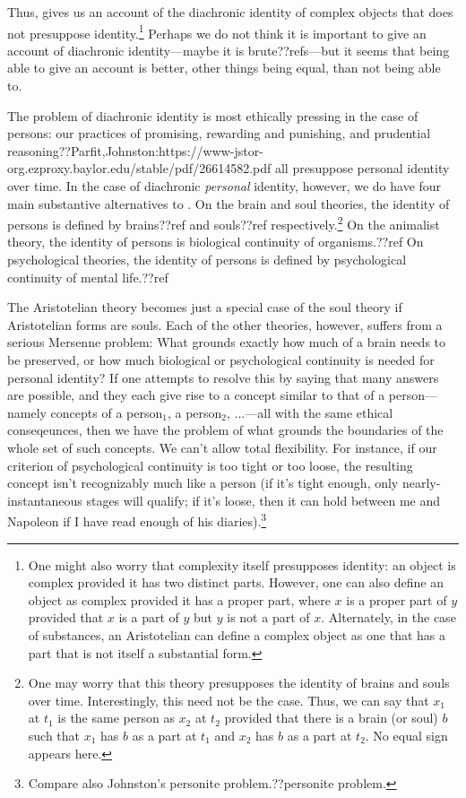 Thus,  gives us an account of the diachronic identity of complex objects
that does not presuppose identity.\footnote{One might also worry that complexity itself
presupposes identity: an object is complex provided it has two distinct parts. However,
one can also define an object as complex provided it has a proper part, where $x$ is 
a proper part of $y$ provided that $x$ is a part of $y$ but $y$ is not a part of $x$.
Alternately, in the case of substances, an Aristotelian can define a complex object as 
one that has a part that is not itself a substantial form.} Perhaps we do not think it is
important to give an account of diachronic identity---maybe it is brute??refs---but it seems that
being able to give an account is better, other things being equal, than not being able to.

The problem of diachronic identity is most ethically pressing in the case of persons: our 
practices of promising, rewarding and punishing, and prudential reasoning??Parfit,Johnston:https://www-jstor-org.ezproxy.baylor.edu/stable/pdf/26614582.pdf 
all presuppose personal identity over time. In the case of diachronic \textit{personal} identity, however,
we do have four main substantive alternatives to . On the brain and soul theories, the
identity of persons is defined by brains??ref and souls??ref respectively.\footnote{One may worry that 
this theory presupposes the identity of brains and souls over time. Interestingly, this need not be the 
case. Thus, we can say that $x_1$ at $t_1$ is the same person as $x_2$ at $t_2$ provided that there is
a brain (or soul) $b$ such that $x_1$ has $b$ as a part at $t_1$ and $x_2$ has $b$ as a part at $t_2$.
No equal sign appears here.} On the animalist 
theory, the identity
of persons is biological continuity of organisms.??ref On psychological theories, the identity of
persons is defined by psychological continuity of mental life.??ref

The Aristotelian theory becomes just a special case of the soul theory if Aristotelian forms are souls.
Each of the other theories, however, suffers from a serious Mersenne problem: What grounds exactly how much
of a brain needs to be preserved, or how much biological or psychological continuity is needed for 
personal identity? If one attempts to resolve this by saying that many answers are possible, and they
each give rise to a concept similar to that of a person---namely concepts of a person$_1$, a person$_2$, ...---all with
the same ethical conseqeunces, then we have the problem of what grounds the boundaries of the whole set of
such concepts. We can't allow total flexibility. For instance, if our criterion of psychological continuity is too tight or too loose, the resulting concept
isn't recognizably much like a person (if it's tight enough, only nearly-instantaneous stages will
qualify; if it's loose, then it can hold between me and Napoleon if I have read enough of his diaries).\footnote{Compare
also Johnston's personite problem.??personite problem.} 

